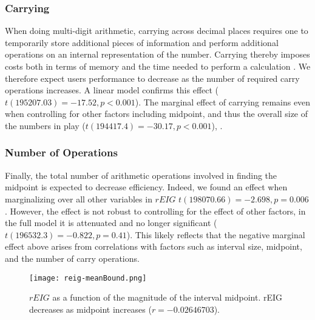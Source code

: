\documentclass[10pt,letterpaper]{article}
\begin{document}
\subsubsection{Carrying}
When doing multi-digit arithmetic, carrying across decimal places requires one to temporarily store additional pieces of information and perform additional operations on an internal representation of the number. Carrying thereby imposes costs both in terms of memory and the time needed to perform a calculation \cite{imbo2007role2}. We therefore expect users performance to decrease as the number of required carry operations increases.
A linear model confirms this effect ($t(195207.03) = -17.52, p<0.001$). The marginal effect of carrying remains even when controlling for other factors including midpoint, and thus the overall size of the numbers in play ($t(194417.4) = -30.17, p<0.001$), .

\subsubsection{Number of Operations}
Finally, the total number of arithmetic operations involved in finding the midpoint is expected to decrease efficiency. Indeed, we found an effect when marginalizing over all other variables in $rEIG$ $t(198070.66) = -2.698, p=0.006$. 
However, the effect is not robust to controlling for the effect of other factors, in the full model it is attenuated and no longer significant ($t(196532.3) = -0.822, p=0.41$).  
This likely reflects that the negative marginal effect above arises from correlations with factors such as interval size, midpoint, and the number of carry operations. 

\begin{figure}[h]
\begin{center}
    \texttt{[image: reig-meanBound.png]}
\end{center}
    \vspace{-6mm}
    \caption{$rEIG$ as a function of the magnitude of the interval midpoint. rEIG decreases as midpoint increases ($r = \num{-0.02646703}$).
}
    \label{fig:reig-meanbound}
\vspace{-2mm}
\end{figure}
\end{document}
